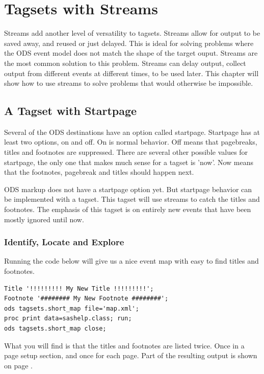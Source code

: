 \chapter{Tagsets with Streams}
Streams add another level of versatility to tagsets.  
Streams allow for output to be saved away, and reused or
just delayed.  This is ideal for solving problems where
the ODS event model does not match the shape of the target
ouput. Streams are the most common solution to this problem.
Streams can delay output, collect output from different events
at different times, to be used later.
This chapter will show how to use streams to solve problems
that would otherwise be impossible.

\section{A Tagset with Startpage}
Several of the ODS destinations have an option called startpage.
Startpage has at least two options, on and off.  On is normal behavior.
Off means that pagebreaks, titles and footnotes are suppressed.  There
are several other possible values for startpage,  the only one that 
makes much sense for a tagset is 'now'.  Now means that the footnotes,
pagebreak and titles should happen next.

ODS markup does not have a startpage option yet.  But startpage behavior
can be implemented with a tagset.  This tagset will use streams to catch the
titles and footnotes.  The emphasis of this tagset is on entirely new
events that have been mostly ignored until now.

\subsection{Identify, Locate and Explore}
Running the code below will give us a nice event map with easy
to find titles and footnotes.

\begin{verbatim}
Title '!!!!!!!!! My New Title !!!!!!!!!';
Footnote '######## My New Footnote ########';
ods tagsets.short_map file='map.xml';
proc print data=sashelp.class; run;
ods tagsets.short_map close;
\end{verbatim}

What you will find is that the titles and footnotes are listed twice.
Once in a page setup section, and once for each page.  Part of the
resulting output is shown on page \pageref{startpage_out}.

